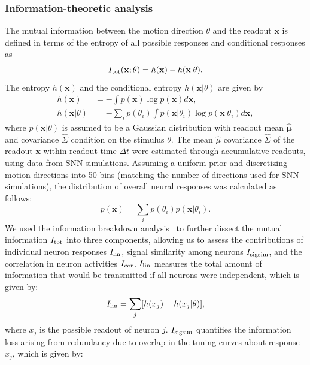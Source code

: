 \subsubsection{Information-theoretic analysis}
The mutual information between the motion direction \(\theta\) and the readout \(\mathbf{x}\) is defined in terms of the entropy of all possible responses and conditional responses as
\begin{equation}
    I_{\rm tot}(\mathbf{x}; \theta) = h(\mathbf{x}) - h(\mathbf{x}|\theta).
\end{equation}
The entropy \(h(\mathbf{x})\) and the conditional entropy \(h(\mathbf{x}| \theta)\) are given by
\begin{align}
    h(\mathbf{x}) &= - \int p(\mathbf{x}) \log p(\mathbf{x}) d\mathbf{x},\\
    h(\mathbf{x}|\theta) &= -\sum_i p(\theta_i) \int p(\mathbf{x}|\theta_i) \log p(\mathbf{x}|\theta_i) d\mathbf{x},
\end{align}
where \( p(\mathbf{x}|\theta)\) is assumed to be a Gaussian distribution with readout mean \(\hat{\mathbf{\mu}}\) and covariance \(\hat{\Sigma}\) condition on the stimulus \(\theta\).
The mean \(\hat{\mu}\) covariance \(\hat{\Sigma}\) of the readout \(\mathbf{x}\) within readout time \(\Delta t\) were estimated through accumulative readouts, using data from SNN simulations.  
Assuming a uniform prior and discretizing motion directions into 50 bins (matching the number of directions used for SNN simulations), the distribution of overall neural responses was calculated as follows:
\begin{equation}
    p(\mathbf{x}) = \sum_i p(\theta_i)p(\mathbf{x}|\theta_i).
\end{equation}
We used the information breakdown analysis~\cite{Pola2003, montani2007role} to further dissect the mutual information \(I_{\rm tot}\) into three components, allowing us to assess the contributions of individual neuron responses \(I_{\rm lin}\), signal similarity among neurons \(I_{\rm sigsim}\), and the correlation in neuron activities \(I_{\rm cor}\).
\(I_{\rm lin}\) measures the total amount of information that would be transmitted if all neurons were independent, which is given by:
\begin{equation}
    I_{\rm lin} = \sum_j [h(x_j) - h(x_j | \theta)],
\end{equation}
where \(x_j\) is the possible readout of neuron \(j\).
\(I_{\rm sigsim}\) quantifies the information loss arising from redundancy due to overlap in the tuning curves about response \(x_j\), which is given by:
